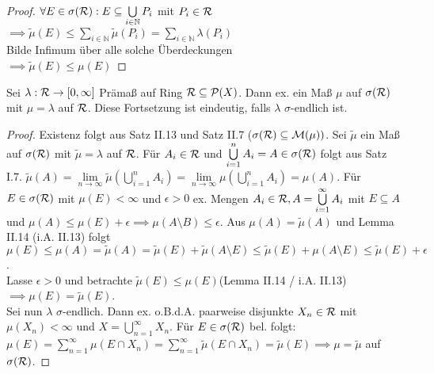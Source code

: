 \documentclass[11pt,a4paper,fleqn,openany]{report}
\begin{document}
    \begin{proof}
      $\forall E \in \sigma(\mathcal{R}): E \subseteq \bigcup\limits_{i \in \mathbb{N}} P_i$ mit $P_i \in \mathcal{R}$\\
      $\implies \tilde{\mu}(E) \leq \sum\limits_{i \in \mathbb{N}} \tilde{\mu}(P_i) = \sum\limits_{i \in \mathbb{N}} \lambda(P_i)$\\
      Bilde Infimum über alle solche Überdeckungen\\
      $\implies \tilde{\mu}(E) \leq \mu(E)$ 
    \end{proof}


    \begin{theorem}[Im Aufschrieb II.14]
      Sei $\lambda: \mathcal{R} \to [0, \infty]$ Prämaß auf Ring $\mathcal{R}\subseteq \mathcal{P}(X)$. Dann ex. ein Maß $\mu$ auf $\sigma(\mathcal{R})$ mit $\mu=\lambda$ auf $\mathcal{R}$. Diese Fortsetzung ist eindeutig, falls $\lambda$ $\sigma$-endlich ist.
    \end{theorem}

    \begin{proof}
      Existenz folgt aus Satz II.13 und Satz II.7 ($\sigma(\mathcal{R}) \subseteq \mathcal{M}(\mu))$. Sei $\tilde{\mu}$ ein Maß auf $\sigma(\mathcal{R})$ mit $\tilde{\mu} = \lambda$ auf $\mathcal{R}$. Für $A_i \in \mathcal{R}$ und $\bigcup\limits_{i = 1}^n A_i = A \in \sigma(\mathcal{R})$ folgt aus Satz I.7. $\tilde{\mu}(A) = \lim\limits_{n \to \infty} \tilde{\mu}(\bigcup\limits_{i=1}^n A_i) = \lim\limits_{n\to\infty} \mu (\bigcup\limits_{i=1}^n A_i) = \mu(A)$. Für $E \in \sigma(\mathcal{R})$ mit $\mu(E) < \infty$ und $\epsilon > 0$ ex. Mengen $A_i \in \mathcal{R}, A = \bigcup\limits_{i=1}^\infty A_i$ mit $E \subseteq A$ und $\mu(A) \leq \mu(E) + \epsilon \implies \mu(A\setminus B) \leq \epsilon$. Aus $\mu(A) = \tilde{\mu}(A)$ und Lemma II.14 (i.A. II.13) folgt \\    
      $\mu(E) \leq \mu(A) = \tilde{\mu}(A) = \tilde{\mu}(E) + \tilde{\mu}(A\setminus E) \leq \tilde{\mu}(E) + \mu(A\setminus E) \leq \tilde{\mu}(E) + \epsilon$. \\
      Lasse $\epsilon > 0$ und betrachte $\tilde{\mu}(E) \leq \mu(E)$(Lemma II.14 / i.A. II.13) $\implies \mu(E) = \tilde{\mu}(E)$. \\ Sei nun $\lambda$ $\sigma$-endlich. Dann ex. o.B.d.A. paarweise disjunkte $X_n \in \mathcal{R}$ mit $\mu(X_n) < \infty$ und $X = \bigcup\limits_{n=1}^{\infty} X_n$. Für $E \in \sigma(\mathcal{R})$ bel. folgt: \\
      $\mu(E) = \sum_{n=1}^{\infty}\mu(E\cap X_n) = \sum_{n=1}^{\infty}\tilde{\mu}(E\cap X_n) = \tilde{\mu}(E) \implies \mu = \tilde{\mu}$ auf $\sigma(\mathcal{R})$.
    \end{proof}
\end{document}
